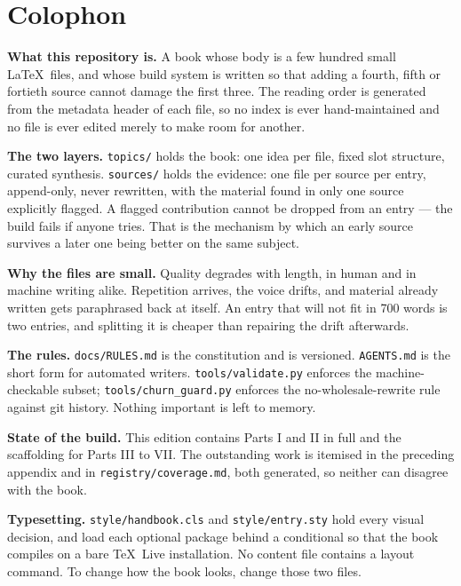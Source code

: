 \chapter*{Colophon}

\begingroup\small

\textbf{What this repository is.} A book whose body is a few hundred small
\LaTeX\ files, and whose build system is written so that adding a fourth,
fifth or fortieth source cannot damage the first three. The reading order is
generated from the metadata header of each file, so no index is ever
hand-maintained and no file is ever edited merely to make room for another.

\textbf{The two layers.} \texttt{topics/} holds the book: one idea per file,
fixed slot structure, curated synthesis. \texttt{sources/} holds the evidence:
one file per source per entry, append-only, never rewritten, with the
material found in only one source explicitly flagged. A flagged contribution
cannot be dropped from an entry --- the build fails if anyone tries. That is
the mechanism by which an early source survives a later one being better on
the same subject.

\textbf{Why the files are small.} Quality degrades with length, in human and
in machine writing alike. Repetition arrives, the voice drifts, and material
already written gets paraphrased back at itself. An entry that will not fit in
700 words is two entries, and splitting it is cheaper than repairing the
drift afterwards.

\textbf{The rules.} \texttt{docs/RULES.md} is the constitution and is
versioned. \texttt{AGENTS.md} is the short form for automated writers.
\texttt{tools/validate.py} enforces the machine-checkable subset;
\texttt{tools/churn\_guard.py} enforces the no-wholesale-rewrite rule against
git history. Nothing important is left to memory.

\textbf{State of the build.} This edition contains Parts I and II in full and
the scaffolding for Parts III to VII. The outstanding work is itemised in the
preceding appendix and in \texttt{registry/coverage.md}, both generated, so
neither can disagree with the book.

\textbf{Typesetting.} \texttt{style/handbook.cls} and \texttt{style/entry.sty}
hold every visual decision, and load each optional package behind a
conditional so that the book compiles on a bare \TeX\ Live installation. No
content file contains a layout command. To change how the book looks, change
those two files.

\par\endgroup

